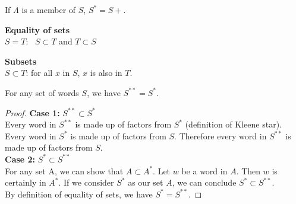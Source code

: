 If \(\Lambda\) is a member of \(S\), \(S^* = S+\).

\textbf{Equality of sets}\\
\(S=T\): \ \(S \subset T\) and \(T \subset S\)

\textbf{Subsets}\\
\(S \subset T\): for all \(x\) in \(S\), \(x\) is also in \(T\).

\begin{theorem}
    For any set of words \(S\), we have \(S^{**}=S^*\).
\end{theorem}
\begin{proof}
    \textbf{Case 1:} \(S^{**} \subset S^*\)\\
    Every word in \(S^{**}\) is made up of factors from \(S^*\) (definition of Kleene star). Every word in \(S^*\) is made up of factors from \(S\). Therefore every word in \(S^{**}\) is made up of factors from \(S\).\\
    \textbf{Case 2:} \(S^* \subset S^{**}\)\\
    For any set A, we can show that \(A \subset A^*\). Let \(w\) be a word in \(A\). Then \(w\) is certainly in \(A^*\). If we consider \(S^*\) as our set \(A\), we can conclude \(S^* \subset S^{**}\).\\
    By definition of equality of sets, we have \(S^* = S^{**}\).
\end{proof}